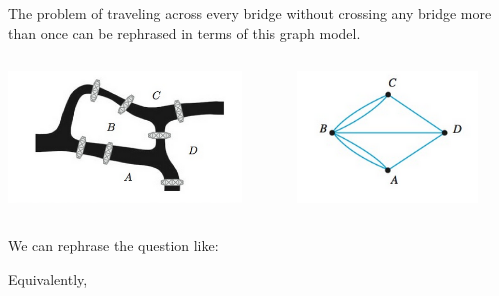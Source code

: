\documentclass[aspectratio=169]{beamer}
\begin{document}
\begin{frame}[plain]{}

    
     The problem of traveling across every bridge without crossing any bridge more than once
can be rephrased in terms of this graph model. 
   

   \begin{columns}[t] %
        \begin{column}[c]{5cm}
          \begin{center}
         \includegraphics[height=3.5cm]{./img/lecture5-fig2.png}
       \end{center}
        \end{column}
       \begin{column}[c]{5cm} %
             \begin{center}
        \includegraphics[height=3.5cm]{./img/lecture5-fig3.png}
      \end{center}           
        \end{column}
  \end{columns}  
  \medskip
  
We can rephrase the question like:
\begin{center}
 \end{center}
 Equivalently, 
 
\end{frame}
\end{document}
